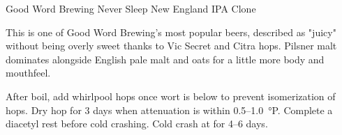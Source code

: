 \begin{recipie}{Good Word Brewing Never Sleep New England IPA Clone}

\begin{aboutblock}
This is one of Good Word Brewing's most popular beers, described as "juicy" without
being overly sweet thanks to Vic Secret and Citra hops. Pilsner malt dominates
alongside English pale malt and oats for a little more body and mouthfeel.
\sourceaha
\end{aboutblock}


\begin{methodandtiming}
 
\begin{mashsteps}
\end{mashsteps}

\begin{fermentationsteps}
\end{fermentationsteps}

\begin{directions}
After boil, add whirlpool hops once wort is below  to prevent 
isomerization of hops. Dry hop for 3 days when attenuation is within
0.5--1.0~°P. Complete a diacetyl rest before cold crashing. Cold crash at
 for 4--6 days.
\end{directions}

\end{methodandtiming}

\pagebreak

\begin{ingredientsblock}

\begin{malts}
\end{malts}

\begin{hops}
\end{hops}


\end{ingredientsblock}

\end{recipie}

